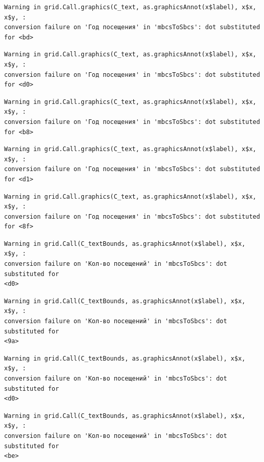 \documentclass[
  letterpaper,
  DIV=11,
  numbers=noendperiod]{scrartcl}
\begin{document}
\begin{verbatim}
Warning in grid.Call.graphics(C_text, as.graphicsAnnot(x$label), x$x, x$y, :
conversion failure on 'Год посещения' in 'mbcsToSbcs': dot substituted for <bd>
\end{verbatim}

\begin{verbatim}
Warning in grid.Call.graphics(C_text, as.graphicsAnnot(x$label), x$x, x$y, :
conversion failure on 'Год посещения' in 'mbcsToSbcs': dot substituted for <d0>
\end{verbatim}

\begin{verbatim}
Warning in grid.Call.graphics(C_text, as.graphicsAnnot(x$label), x$x, x$y, :
conversion failure on 'Год посещения' in 'mbcsToSbcs': dot substituted for <b8>
\end{verbatim}

\begin{verbatim}
Warning in grid.Call.graphics(C_text, as.graphicsAnnot(x$label), x$x, x$y, :
conversion failure on 'Год посещения' in 'mbcsToSbcs': dot substituted for <d1>
\end{verbatim}

\begin{verbatim}
Warning in grid.Call.graphics(C_text, as.graphicsAnnot(x$label), x$x, x$y, :
conversion failure on 'Год посещения' in 'mbcsToSbcs': dot substituted for <8f>
\end{verbatim}

\begin{verbatim}
Warning in grid.Call(C_textBounds, as.graphicsAnnot(x$label), x$x, x$y, :
conversion failure on 'Кол-во посещений' in 'mbcsToSbcs': dot substituted for
<d0>
\end{verbatim}

\begin{verbatim}
Warning in grid.Call(C_textBounds, as.graphicsAnnot(x$label), x$x, x$y, :
conversion failure on 'Кол-во посещений' in 'mbcsToSbcs': dot substituted for
<9a>
\end{verbatim}

\begin{verbatim}
Warning in grid.Call(C_textBounds, as.graphicsAnnot(x$label), x$x, x$y, :
conversion failure on 'Кол-во посещений' in 'mbcsToSbcs': dot substituted for
<d0>
\end{verbatim}

\begin{verbatim}
Warning in grid.Call(C_textBounds, as.graphicsAnnot(x$label), x$x, x$y, :
conversion failure on 'Кол-во посещений' in 'mbcsToSbcs': dot substituted for
<be>
\end{verbatim}
\end{document}
